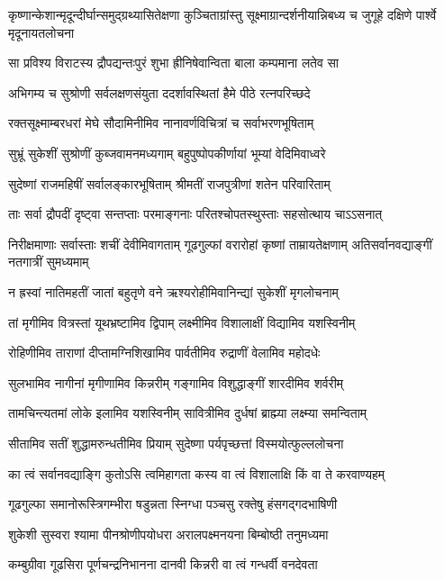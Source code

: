 \threelineshloka
{कृष्णान्केशान्मृदून्दीर्घान्समुद्ग्रथ्यासितेक्षणा}
{कुञ्चिताग्रांस्तु सूक्ष्माग्रान्दर्शनीयान्निबध्य च}
{जुगूहे दक्षिणे पार्श्वे मृदूनायतलोचना}


\twolineshloka
{सा प्रविश्य विराटस्य द्रौपद्यन्तःपुरं शुभा}
{ह्रीनिषेवान्विता बाला कम्पमाना लतेव सा}


\twolineshloka
{अभिगम्य च सुश्रोणी सर्वलक्षणसंयुता}
{ददर्शावस्थितां हैमे पीठे रत्नपरिच्छदे}


\twolineshloka
{रक्तसूक्ष्माम्बरधरां मेघे सौदामिनीमिव}
{नानावर्णविचित्रां च सर्वाभरणभूषिताम्}


\twolineshloka
{सुभ्रूं सुकेशीं सुश्रोणीं कुब्जवामनमध्यगाम्}
{बहुपुष्पोपकीर्णायां भूम्यां वेदिमिवाध्वरे}


\twolineshloka
{सुदेष्णां राजमहिषीं सर्वालङ्कारभूषिताम्}
{श्रीमतीं राजपुत्रीणां शतेन परिवारिताम्}


\twolineshloka
{ताः सर्वा द्रौपदीं दृष्ट्वा सन्तप्ताः परमाङ्गनाः}
{परितश्चोपतस्थुस्ताः सहसोत्थाय चाऽऽसनात्}


\threelineshloka
{निरीक्षमाणाः सर्वास्ताः शचीं देवीमिवागताम्}
{गूढगुल्फां वरारोहां कृष्णां ताम्रायतेक्षणाम्}
{अतिसर्वानवद्याङ्गीं नतगात्रीं सुमध्यमाम्}


\twolineshloka
{न ह्रस्वां नातिमहतीं जातां बहुतृणे वने}
{ऋश्यरोहीमिवानिन्द्यां सुकेशीं मृगलोचनाम्}


\twolineshloka
{तां मृगीमिव वित्रस्तां यूथभ्रष्टामिव द्विपाम्}
{लक्ष्मीमिव विशालाक्षीं विद्यामिव यशस्विनीम्}


\twolineshloka
{रोहिणीमिव ताराणां दीप्तामग्निशिखामिव}
{पार्वतीमिव रुद्राणीं वेलामिव महोदधेः}


\twolineshloka
{सुलभामिव नागीनां मृगीणामिव किन्नरीम्}
{गङ्गामिव विशुद्धाङ्गीं शारदीमिव शर्वरीम्}


\twolineshloka
{तामचिन्त्यतमां लोके इलामिव यशस्विनीम्}
{सावित्रीमिव दुर्धषां ब्राह्म्या लक्ष्म्या समन्विताम्}


\twolineshloka
{सीतामिव सतीं शुद्धामरुन्धतीमिव प्रियाम्}
{सुदेष्णा पर्यपृच्छत्तां विस्मयोत्फुल्ललोचना}


\twolineshloka
{का त्वं सर्वानवद्याङ्गि कुतोऽसि त्वमिहागता}
{कस्य वा त्वं विशालाक्षि किं वा ते करवाण्यहम्}


\twolineshloka
{गूढगुल्फा समानोरूस्त्रिगम्भीरा षडुन्नता}
{स्निग्धा पञ्चसु रक्तेषु हंसगद्गदभाषिणी}


\twolineshloka
{शुकेशी सुस्वरा श्यामा पीनश्रोणीपयोधरा}
{अरालपक्ष्मनयना बिम्बोष्ठी तनुमध्यमा}


\twolineshloka
{कम्बुग्रीवा गूढसिरा पूर्णचन्द्रनिभानना}
{दानवी किन्नरी वा त्वं गन्धर्वी वनदेवता}


